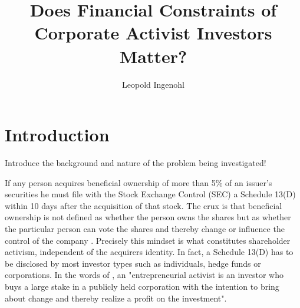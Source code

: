 \documentclass[12pt]{article}
\title{Does Financial Constraints of Corporate Activist Investors Matter?}
\author{Leopold Ingenohl}
\begin{document}
\maketitle

\pagebreak


\section{Introduction}

\begin{center}
	Introduce the background and nature of the problem being investigated!
\end{center}
If any person acquires beneficial ownership of more than 5\% of an issuer's securities he must file with the Stock Exchange Control (SEC) a Schedule 13(D) within 10 days after the acquisition of that stock. The crux is that beneficial ownership is not defined as whether the person owns the shares but as whether the particular person can vote the shares and thereby change or influence the control of the company \citep[p.24]{Morrison2015}. Precisely this mindset is what constitutes shareholder activism, independent of the acquirers identity. In fact, a Schedule 13(D) has to be disclosed by most investor types such as individuals, hedge funds or corporations. In the words of \citet[p.187]{Klein2009}, an "entrepreneurial activist is an investor who buys a large stake in a publicly held corporation with the intention to bring about change and thereby realize a profit on the investment".
\end{document}
